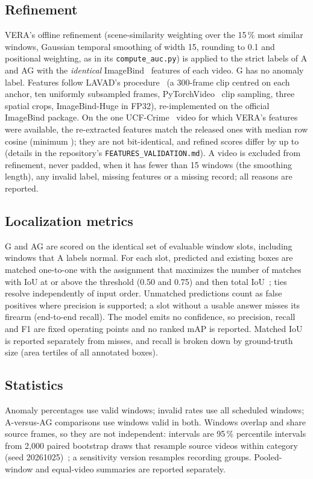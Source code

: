 \documentclass[11pt]{article}
\begin{document}
\subsection{Refinement}\label{sec:methods-refinement}
VERA's offline refinement (scene-similarity weighting over the 15\,\% most similar windows, Gaussian temporal smoothing of width 15, rounding to 0.1 and positional weighting, as in its \texttt{compute\_auc.py}) is applied to the strict labels of A and AG with the \emph{identical} ImageBind~\cite{girdhar2023imagebind} features of each video. G has no anomaly label. Features follow LAVAD's procedure~\cite{zanella2024lavad} (a 300-frame clip centred on each anchor, ten uniformly subsampled frames, PyTorchVideo~\cite{fan2021pytorchvideo} clip sampling, three spatial crops, ImageBind-Huge in FP32), re-implemented on the official ImageBind package. On the one UCF-Crime~\cite{sultani2018ucfcrime} video for which VERA's features were available, the re-extracted features match the released ones with median row cosine  (minimum ); they are not bit-identical, and refined scores differ by up to  (details in the repository's \texttt{FEATURES\_VALIDATION.md}). A video is excluded from refinement, never padded, when it has fewer than 15 windows (the smoothing length), any invalid label, missing features or a missing record; all reasons are reported.

\subsection{Localization metrics}
G and AG are scored on the identical set of evaluable window slots, including windows that A labels normal. For each slot, predicted and existing boxes are matched one-to-one with the assignment that maximizes the number of matches with IoU at or above the threshold (0.50 and 0.75) and then total IoU~\cite{kuhn1955hungarian}; ties resolve independently of input order. Unmatched predictions count as false positives where precision is supported; a slot without a usable answer misses its firearm (end-to-end recall). The model emits no confidence, so precision, recall and F1 are fixed operating points and no ranked mAP is reported. Matched IoU is reported separately from misses, and recall is broken down by ground-truth size (area tertiles of all annotated boxes).

\subsection{Statistics}
Anomaly percentages use valid windows; invalid rates use all scheduled windows; A-versus-AG comparisons use windows valid in both. Windows overlap and share source frames, so they are not independent: intervals are 95\,\% percentile intervals from 2,000 paired bootstrap draws that resample source videos within category (seed 20261025)~\cite{efron1993bootstrap}; a sensitivity version resamples recording groups. Pooled-window and equal-video summaries are reported separately.
\end{document}
